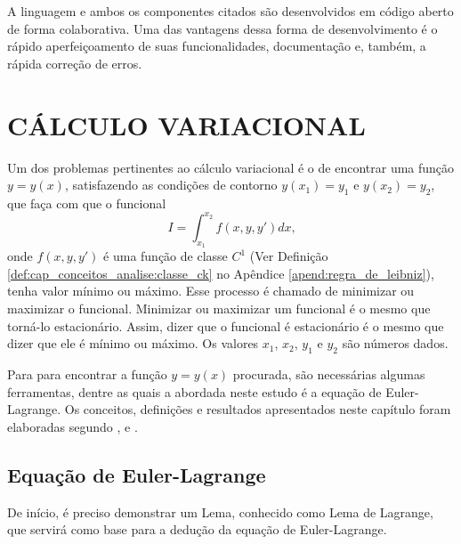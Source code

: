 \documentclass[
	12pt,				%
	openright,			%
    twoside,			%
	a4paper,			%
	chapter=TITLE,		%
	english,			%
	french,				%
	spanish,			%
	brazil				%
	]{abntex2}
\numberwithin{lema}{chapter}
\numberwithin{teorema}{chapter}
\numberwithin{definicao}{chapter}
\numberwithin{exemplo}{chapter}
\numberwithin{figure}{chapter}
\begin{document}
A linguagem e ambos os componentes citados são desenvolvidos em código aberto de forma colaborativa. Uma das vantagens dessa forma de desenvolvimento é o rápido aperfeiçoamento de suas funcionalidades, documentação e, também, a rápida correção de erros.

\chapter{CÁLCULO VARIACIONAL}
\label{cap:calc_var}

Um dos problemas pertinentes ao cálculo variacional é o de encontrar uma função $y=y(x)$, satisfazendo as condições de contorno $y(x_1)=y_1$ e $y(x_2)=y_2$, que faça com que o funcional
\begin{equation}
	\label{eqn:cap_calc_var:int_funcional}
	I = \int_{x_1}^{x_2} f(x,y,y')dx\text{,}
\end{equation}
onde $f(x, y, y')$ é uma função de classe $C^1$ (Ver Definição \ref{def:cap_conceitos_analise:classe_ck} no Apêndice \ref{apend:regra_de_leibniz}), tenha valor mínimo ou máximo. Esse processo é chamado de minimizar ou maximizar o funcional. Minimizar ou maximizar um funcional é o mesmo que torná-lo estacionário. Assim, dizer que o funcional é estacionário é o mesmo que dizer que ele é mínimo ou máximo. Os valores $x_1$, $x_2$, $y_1$ e $y_2$ são números dados.

Para para encontrar a função $y=y(x)$ procurada, são necessárias algumas ferramentas, dentre as quais a abordada neste estudo é a equação de Euler-Lagrange. Os conceitos, definições e resultados apresentados neste capítulo foram elaboradas segundo ,  e .

\section{Equação de Euler-Lagrange}
\label{sec:eq_euler_lagrange}

De início, é preciso demonstrar um Lema, conhecido como Lema de Lagrange, que servirá como base para a dedução da equação de Euler-Lagrange.
\end{document}
